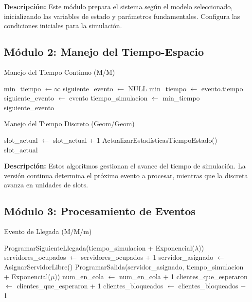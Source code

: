 \documentclass{article}
\begin{document}
\textbf{Descripción:} Este módulo prepara el sistema según el modelo seleccionado, inicializando las variables de estado y parámetros fundamentales. Configura las condiciones iniciales para la simulación.

\subsection{Módulo 2: Manejo del Tiempo-Espacio}

\begin{algorithm}[H]
\caption{Manejo del Tiempo Continuo (M/M)}
\begin{algorithmic}[1]
\STATE min\_tiempo $\gets \infty$
\STATE siguiente\_evento $\gets$ NULL
        \STATE min\_tiempo $\gets$ evento.tiempo
        \STATE siguiente\_evento $\gets$ evento
    \ENDIF
\ENDFOR
\STATE tiempo\_simulacion $\gets$ min\_tiempo
\RETURN siguiente\_evento
\end{algorithmic}
\end{algorithm}

\begin{algorithm}[H]
\caption{Manejo del Tiempo Discreto (Geom/Geom)}
\begin{algorithmic}[1]
\STATE slot\_actual $\gets$ slot\_actual + 1
\STATE ActualizarEstadísticasTiempoEstado()
\RETURN slot\_actual
\end{algorithmic}
\end{algorithm}

\textbf{Descripción:} Estos algoritmos gestionan el avance del tiempo de simulación. La versión continua determina el próximo evento a procesar, mientras que la discreta avanza en unidades de slots.

\subsection{Módulo 3: Procesamiento de Eventos}

\begin{algorithm}[H]
\caption{Evento de Llegada (M/M/m)}
\begin{algorithmic}[1]
\STATE ProgramarSiguienteLlegada(tiempo\_simulacion + Exponencial($\lambda$))
    \STATE servidores\_ocupados $\gets$ servidores\_ocupados + 1
    \STATE servidor\_asignado $\gets$ AsignarServidorLibre()
    \STATE ProgramarSalida(servidor\_asignado, tiempo\_simulacion + Exponencial($\mu$))
\ELSE
        \STATE num\_en\_cola $\gets$ num\_en\_cola + 1
        \STATE clientes\_que\_esperaron $\gets$ clientes\_que\_esperaron + 1
    \ELSE
        \STATE clientes\_bloqueados $\gets$ clientes\_bloqueados + 1
    \ENDIF
\ENDIF
\end{algorithmic}
\end{algorithm}
\end{document}
